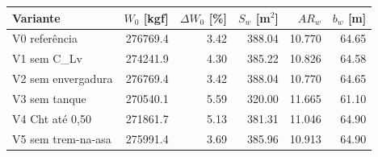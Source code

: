 \begin{tabular}{lrrrrr}
\toprule
Variante & $W_0$ [kgf] & $\Delta W_0$ [\%] & $S_w$ [m$^2$] & $AR_w$ & $b_w$ [m] \\
\midrule
V0 referência & 276769.4 & 3.42 & 388.04 & 10.770 & 64.65 \\
V1 sem C\_Lv & 274241.9 & 4.30 & 385.22 & 10.826 & 64.58 \\
V2 sem envergadura & 276769.4 & 3.42 & 388.04 & 10.770 & 64.65 \\
V3 sem tanque & 270540.1 & 5.59 & 320.00 & 11.665 & 61.10 \\
V4 Cht até 0,50 & 271861.7 & 5.13 & 381.31 & 11.046 & 64.90 \\
V5 sem trem-na-asa & 275991.4 & 3.69 & 385.96 & 10.913 & 64.90 \\
\bottomrule
\end{tabular}